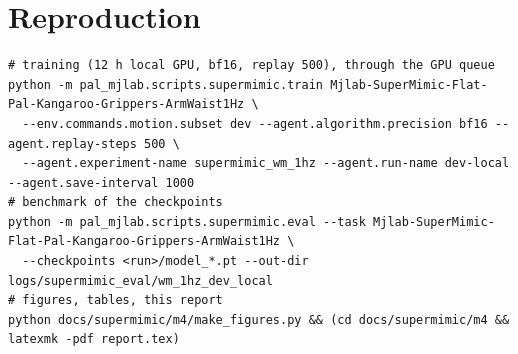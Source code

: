 \documentclass[10pt]{article}
\begin{document}
\section{Reproduction}

\begin{footnotesize}
\begin{verbatim}
# training (12 h local GPU, bf16, replay 500), through the GPU queue
python -m pal_mjlab.scripts.supermimic.train Mjlab-SuperMimic-Flat-Pal-Kangaroo-Grippers-ArmWaist1Hz \
  --env.commands.motion.subset dev --agent.algorithm.precision bf16 --agent.replay-steps 500 \
  --agent.experiment-name supermimic_wm_1hz --agent.run-name dev-local --agent.save-interval 1000
# benchmark of the checkpoints
python -m pal_mjlab.scripts.supermimic.eval --task Mjlab-SuperMimic-Flat-Pal-Kangaroo-Grippers-ArmWaist1Hz \
  --checkpoints <run>/model_*.pt --out-dir logs/supermimic_eval/wm_1hz_dev_local
# figures, tables, this report
python docs/supermimic/m4/make_figures.py && (cd docs/supermimic/m4 && latexmk -pdf report.tex)
\end{verbatim}
\end{footnotesize}
\end{document}
